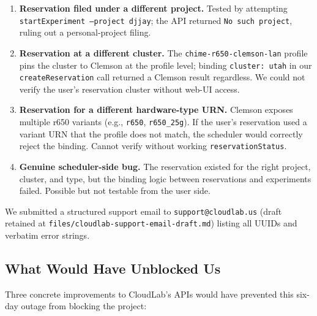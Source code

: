 \documentclass[11pt,a4paper]{article}
\begin{document}
\begin{enumerate}[nosep]
    \item \textbf{Reservation filed under a different project.} Tested by attempting \texttt{startExperiment --project djjay}; the API returned \texttt{No such project}, ruling out a personal-project filing.
    \item \textbf{Reservation at a different cluster.} The \texttt{chime-r650-clemson-lan} profile pins the cluster to Clemson at the profile level; binding \texttt{cluster: utah} in our \texttt{createReservation} call returned a Clemson result regardless. We could not verify the user's reservation cluster without web-UI access.
    \item \textbf{Reservation for a different hardware-type URN.} Clemson exposes multiple r650 variants (e.g., \texttt{r650}, \texttt{r650\_25g}). If the user's reservation used a variant URN that the profile does not match, the scheduler would correctly reject the binding. Cannot verify without working \texttt{reservationStatus}.
    \item \textbf{Genuine scheduler-side bug.} The reservation existed for the right project, cluster, and type, but the binding logic between reservations and experiments failed. Possible but not testable from the user side.
\end{enumerate}

We submitted a structured support email to \texttt{support@cloudlab.us} (draft retained at \texttt{files/cloudlab-support-email-draft.md}) listing all UUIDs and verbatim error strings.

\subsection{What Would Have Unblocked Us}
\label{api-additions:postmortem}

Three concrete improvements to CloudLab's APIs would have prevented this six-day outage from blocking the project:
\end{document}
